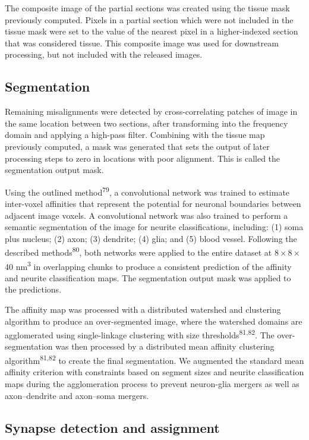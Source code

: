 \documentclass{article}
\begin{document}
The composite image of the partial sections was created using the tissue mask previously computed. Pixels in a partial section which were not included in the tissue mask were set to the value of the nearest pixel in a higher-indexed section that was considered tissue. This composite image was used for downstream processing, but not included with the released images.

\subsection*{Segmentation}

Remaining misalignments were detected by cross-correlating patches of image in the same location between two sections, after transforming into the frequency domain and applying a high-pass filter. Combining with the tissue map previously computed, a mask was generated that sets the output of later processing steps to zero in locations with poor alignment. This is called the segmentation output mask.

Using the outlined method\textsuperscript{79}, a convolutional network was trained to estimate inter-voxel affinities that represent the potential for neuronal boundaries between adjacent image voxels. A convolutional network was also trained to perform a semantic segmentation of the image for neurite classifications, including: (1) soma plus nucleus; (2) axon; (3) dendrite; (4) glia; and (5) blood vessel. Following the described methods\textsuperscript{80}, both networks were applied to the entire dataset at 8\,×\,8\,×\,40 nm\textsuperscript{3} in overlapping chunks to produce a consistent prediction of the affinity and neurite classification maps. The segmentation output mask was applied to the predictions.

The affinity map was processed with a distributed watershed and clustering algorithm to produce an over-segmented image, where the watershed domains are agglomerated using single-linkage clustering with size thresholds\textsuperscript{81,82}. The over-segmentation was then processed by a distributed mean affinity clustering algorithm\textsuperscript{81,82} to create the final segmentation. We augmented the standard mean affinity criterion with constraints based on segment sizes and neurite classification maps during the agglomeration process to prevent neuron-glia mergers as well as axon–dendrite and axon–soma mergers.

\subsection*{Synapse detection and assignment}
\end{document}
